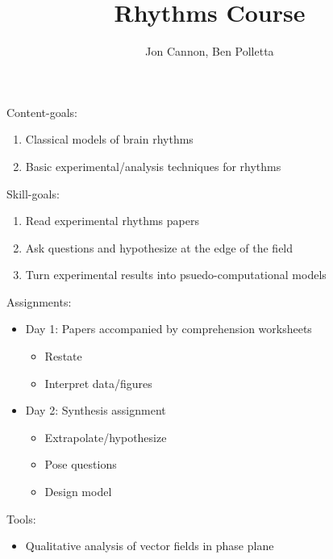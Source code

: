 \documentclass[11pt, reqno]{amsart}
\title{Rhythms Course}
\author{Jon Cannon, Ben Polletta}
\numberwithin{figure}{section}
\numberwithin{equation}{section}
\begin{document}
\maketitle


Content-goals:

\begin{enumerate}
\item Classical models of brain rhythms
\item Basic experimental/analysis techniques for rhythms
\end{enumerate}

Skill-goals:

\begin{enumerate}
\item Read experimental rhythms papers
\item Ask questions and hypothesize at the edge of the field
\item Turn experimental results into psuedo-computational models
\end{enumerate}

Assignments:
\begin{itemize}
\item Day 1: Papers accompanied by comprehension worksheets
\begin{itemize}
\item Restate
\item Interpret data/figures
\end{itemize}
\item Day 2: Synthesis assignment
\begin{itemize}
\item Extrapolate/hypothesize
\item Pose questions
\item Design model
\end{itemize}
\end{itemize}

Tools:
\begin{itemize}
\item Qualitative analysis of vector fields in phase plane
\end{itemize}
\end{document}
